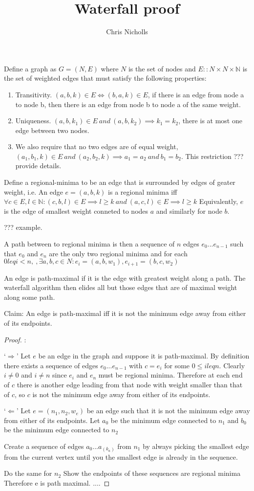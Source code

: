 \documentclass{journal}
\title{\LARGE \bf
Waterfall proof
}
\author{Chris Nicholls
}
\begin{document}
Define a graph as $G = (N,E)$
where $N$ is the set of nodes and $E :: N\times N \times \mathbb{N}$ is the set of weighted edges
that must satisfy the following properties:
\begin{enumerate}
\item Transitivity. $(a,b,k) \in E  \iff (b,a,k) \in E$, if there is an edge from node a to node b, then there is an edge from node b to node a of the same weight.
\item Uniqueness.   $(a,b,k_1) \in E\ and\ (a,b,k_2) \implies k_1 = k_2$, there is at most one edge between two nodes.
\item We also require that no two edges are of equal weight, $(a_1,b_1,k) \in E\ and\ (a_2,b_2,k) \implies a_1 = a_2\ and\ b_1 = b_2$. This restriction ??? provide details.

\end{enumerate}

Define a regional-minima to be an edge that is surrounded by edges of geater weight, i.e.
An edge $e = (a,b,k)$ is a regional minima iff
$\forall c \in E, l \in \mathbb{N} :
  (c,b,l) \in E \implies l \geq k\ and\
  (a,c,l) \in E \implies l \geq k $
Equivalently, $e$ is the edge of smallest weight conneted to nodes $a$ and similarly for node $b$.

??? example.

A path between to regional minima is then a sequence of $n$ edges $e_0 ... e_{n-1}$
such that $e_0$ and $e_n$ are the only two regional minima
and for each $ 0 leq i < n,\ , \exists a,b,c \in N \colon e_i = (a,b,w_1) , e_{i+1} = (b,c,w_2)$

\noindent An edge is path-maximal if it is the edge with greatest weight along a path.
The waterfall algorithm then elides all but those edges that are of maximal weight along some path.

\noindent Claim: An edge is path-maximal iff it is not the minimum edge away from either of its endpoints.

\begin{proof}:

\noindent `$\Rightarrow$'
\indent
  Let $e$ be an edge in the graph and suppose it is path-maximal.
  By definition there exists a sequence of edges $e_0 ... e_{n-1}$
  with $c = e_i$ for some $ 0 \leq i leq n$. Clearly $i \neq 0$ and $i \neq n$ since
  $e_i$ and $e_n$ must be regional minima. Therefore at each end of $c$ there is another edge
  leading from that node with weight smaller than that of $c$, so $c$ is
  not the minimum edge away from either of its endpoints.


\noindent
`$\Leftarrow$'
\indent
  Let $e = (n_1,n_2,w_e)$ be an edge such that it is not the minimum edge away from either of its endpoints.
  Let  $a_0$ be the minimum edge connected to $n_1$ and $b_0$ be the minimum edge connected to $n_2$

  Create a sequence of edges $a_0 ... a_(k_a)$ from $n_1$ by always picking the smallest edge from the current vertex until
  you the smallest edge is already in the sequence.

  Do  the same for $n_2$
  Show the endpoints of these sequences are regional minima
  Therefore e is path maximal.
  ....


\end{proof}
\end{document}
